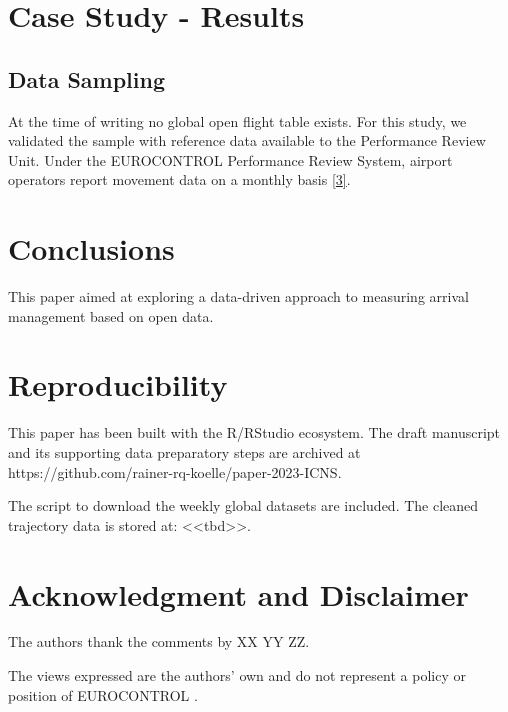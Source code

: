 \documentclass[letterpaper, 10 pt, journal, twoside]{IEEEtran}
\begin{document}
\hypertarget{case-study---results}{%
\section{Case Study - Results}\label{case-study---results}}

\hypertarget{data-sampling}{%
\subsection{Data Sampling}\label{data-sampling}}

At the time of writing no global open flight table exists. For this
study, we validated the sample with reference data available to the
Performance Review Unit. Under the EUROCONTROL Performance Review
System, airport operators report movement data on a monthly basis
\protect\hyperlink{ref-apdf_v1_2019}{{[}3{]}}.

\hypertarget{conclusions}{%
\section{Conclusions}\label{conclusions}}

This paper aimed at exploring a data-driven approach to measuring
arrival management based on open data.

\hypertarget{reproducibility}{%
\section*{Reproducibility}\label{reproducibility}}

This paper has been built with the R/RStudio ecosystem. The draft
manuscript and its supporting data preparatory steps are archived at
https://github.com/rainer-rq-koelle/paper-2023-ICNS.

The script to download the weekly global datasets are included. The
cleaned trajectory data is stored at:
\textless\textless tbd\textgreater\textgreater.

\hypertarget{acknowledgment-and-disclaimer}{%
\section*{Acknowledgment and
Disclaimer}\label{acknowledgment-and-disclaimer}}

The authors thank the comments by XX YY ZZ.

The views expressed are the authors' own and do not represent a policy
or position of EUROCONTROL .
\end{document}
